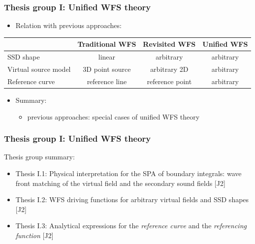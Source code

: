 \documentclass{beamer}
\renewcommand{\arraystretch}{1}
\begin{document}
\begin{frame}
\frametitle{Thesis group I: Unified WFS theory}

\begin{itemize}
\item Relation with previous approaches:
\end{itemize}
%
\begin{table}
\small
\renewcommand*{\arraystretch}{1.5}
\hspace{-5mm}
\begin{tabular}{l | c | c | c  }
 		 			 & Traditional WFS  & Revisited WFS    & Unified WFS\\
\hline \hline
SSD shape 			 &  linear 		    &   arbitrary      & arbitrary  \\ 
Virtual source model &  3D point source &  arbitrary 2D    & arbitrary  \\
Reference curve 	 &  reference line  &  reference point & arbitrary
\end{tabular}
\end{table}
%
	\vspace{5mm}
\begin{tcolorbox}
\begin{itemize}
\item Summary:
	\begin{itemize}
	\item previous approaches: special cases of unified WFS theory
	\end{itemize}	
\end{itemize}
\end{tcolorbox}	
\end{frame}

\begin{frame}
\frametitle{Thesis group I: Unified WFS theory}
Thesis group summary:
	\vspace{3mm}
	\begin{itemize}
	\item Thesis I.1: Physical interpretation for the SPA of boundary integrals: wave front matching of the virtual field and the secondary sound fields [J2]
	\vspace{3mm}
	\item Thesis I.2: WFS driving functions for arbitrary virtual fields and SSD shapes [J2]
	\vspace{3mm}
	\item Thesis I.3: Analytical expressions for the \emph{reference curve} and the \emph{referencing function} [J2]
	\end{itemize}
\end{frame}
\end{document}
